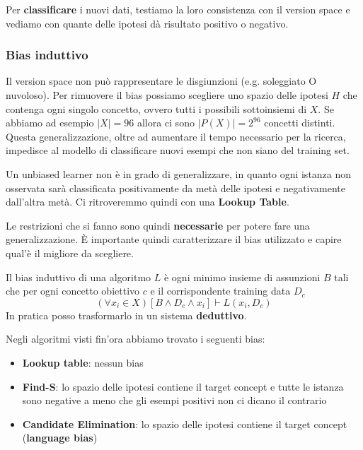 Per \textbf{classificare} i nuovi dati, testiamo la loro consistenza con il version space e vediamo con quante delle ipotesi dà risultato positivo o negativo.

\subsubsection{Bias induttivo}
Il version space non può rappresentare le disgiunzioni (e.g. soleggiato O nuvoloso). Per rimuovere il bias possiamo scegliere uno spazio delle ipotesi $H$ che contenga ogni singolo concetto, ovvero tutti i possibili sottoinsiemi di $X$. Se abbiamo ad esempio $\lvert X \rvert=96$ allora ci sono $\lvert P(X)\rvert = 2^{96}$ concetti distinti. \\
Questa generalizzazione, oltre ad aumentare il tempo necessario per la ricerca, impedisce al modello di classificare nuovi esempi che non siano del training set.
\begin{definition}
	Un unbiased learner non è in grado di generalizzare, in quanto ogni istanza non osservata sarà classificata positivamente da metà delle ipotesi e negativamente dall'altra metà. Ci ritroveremmo quindi con una \textbf{Lookup Table}.
\end{definition}
\noindent Le restrizioni che si fanno sono quindi \textbf{necessarie} per potere fare una generalizzazione. È importante quindi caratterizzare il bias utilizzato e capire qual'è il migliore da scegliere.

\begin{definition}
	Il bias induttivo di una algoritmo $L$ è ogni minimo insieme di assunzioni $B$ tali che per ogni concetto obiettivo $c$ e il corrispondente training data $D_c$
	\begin{equation}
		(\forall x_i \in X)[B \land D_c \land x_i] \vdash L(x_i, D_c)
	\end{equation}
	In pratica posso trasformarlo in un sistema \textbf{deduttivo}.
\end{definition}
Negli algoritmi visti fin'ora abbiamo trovato i seguenti bias:
\begin{itemize}
	\item \textbf{Lookup table}: nessun bias
	\item \textbf{Find-S}: lo spazio delle ipotesi contiene il target concept e tutte le istanza sono negative a meno che gli esempi positivi non ci dicano il contrario
	\item \textbf{Candidate Elimination}: lo spazio delle ipotesi contiene il target concept (\textbf{language bias})
\end{itemize}

